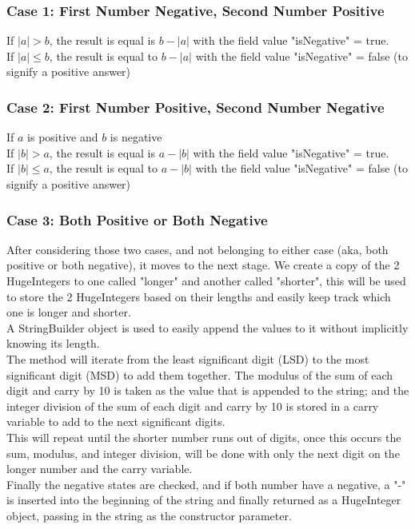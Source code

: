 \documentclass[12pt, letterpaper, titlepage, hidelinks]{article}
\begin{document}
		\subsubsection{Case 1: First Number Negative, Second Number Positive}
			If $|a| > b$, the result is equal is $b - |a|$ with the field value "isNegative" = true.\\
			If $|a| \leq b$, the result is equal to $b - |a|$ with the field value "isNegative" = false (to signify a positive answer)
		\subsubsection{Case 2: First Number Positive, Second Number Negative}
			If $a$ is positive and $b$ is negative\\
			If $|b| > a$, the result is equal is $a - |b|$ with the field value "isNegative" = true.\\
			If $|b| \leq a$, the result is equal to $a - |b|$ with the field value "isNegative" = false (to signify a positive answer)
		\subsubsection{Case 3: Both Positive or Both Negative}
			After considering those two cases, and not belonging to either case (aka, both positive or both negative), it moves to the next stage. We create a copy of the 2 HugeIntegers to one called "longer" and another called "shorter", this will be used to store the 2 HugeIntegers based on their lengths and easily keep track which one is longer and shorter.\\
			A StringBuilder object is used to easily append the values to it without implicitly knowing its length.\\
			The method will iterate from the least significant digit (LSD) to the most significant digit (MSD) to add them together. The modulus of the sum of each digit and carry by 10 is taken as the value that is appended to the string; and the integer division of the sum of each digit and carry by 10 is stored in a carry variable to add to the next significant digits.\\
			This will repeat until the shorter number runs out of digits, once this occurs the sum, modulus, and integer division, will be done with only the next digit on the longer number and the carry variable.\\
			Finally the negative states are checked, and if both number have a negative, a "-" is inserted into the beginning of the string and finally returned as a HugeInteger object, passing in the string as the constructor parameter.
\end{document}

